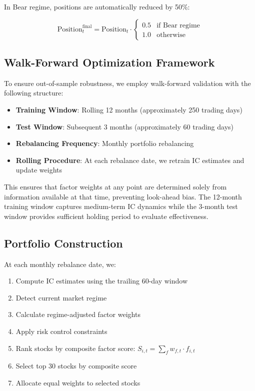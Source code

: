 In Bear regime, positions are automatically reduced by 50\%:

\begin{equation}
\text{Position}_t^{\text{final}} = \text{Position}_t \cdot \begin{cases}
0.5 & \text{if Bear regime} \\
1.0 & \text{otherwise}
\end{cases}
\end{equation}

\subsection{Walk-Forward Optimization Framework}

To ensure out-of-sample robustness, we employ walk-forward validation with the following structure:

\begin{itemize}
    \item \textbf{Training Window}: Rolling 12 months (approximately 250 trading days)
    \item \textbf{Test Window}: Subsequent 3 months (approximately 60 trading days)
    \item \textbf{Rebalancing Frequency}: Monthly portfolio rebalancing
    \item \textbf{Rolling Procedure}: At each rebalance date, we retrain IC estimates and update weights
\end{itemize}

This ensures that factor weights at any point are determined solely from information available at that time, preventing look-ahead bias. The 12-month training window captures medium-term IC dynamics while the 3-month test window provides sufficient holding period to evaluate effectiveness.

\subsection{Portfolio Construction}

At each monthly rebalance date, we:

\begin{enumerate}
    \item Compute IC estimates using the trailing 60-day window
    \item Detect current market regime
    \item Calculate regime-adjusted factor weights
    \item Apply risk control constraints
    \item Rank stocks by composite factor score: $S_{i,t} = \sum_f w_{f,t} \cdot f_{i,t}$
    \item Select top 30 stocks by composite score
    \item Allocate equal weights to selected stocks
\end{enumerate}

